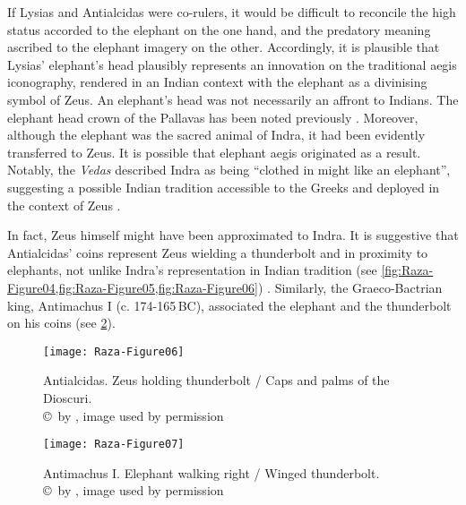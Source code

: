 \documentclass{ijsra}
\renewcommand\BC{{\,BC\xspace}}
\begin{document}
If Lysias and Antialcidas were co-rulers, it would be difficult to reconcile the high status accorded to the elephant on the one hand, and the predatory meaning ascribed to the elephant imagery on the other.
Accordingly, it is plausible that Lysias’ elephant’s head plausibly represents an innovation on the traditional aegis iconography, rendered in an Indian context with the elephant as a divinising symbol of Zeus.
An elephant’s head was not necessarily an affront to Indians. The elephant head crown of the Pallavas has been noted previously \parencite[66--70]{Hudson2008}. 
Moreover, although the elephant was the sacred animal of Indra, it had been evidently transferred to Zeus.
It is possible that elephant aegis originated as a result.
Notably, the \emph{Vedas} described Indra as being “clothed in might like an elephant”, suggesting a possible Indian tradition accessible to the Greeks and deployed in the context of Zeus \parencite[22]{Gupta1983}. 

In fact, Zeus himself might have been approximated to Indra.
It is suggestive that Antialcidas’ coins represent Zeus wielding a thunderbolt and in proximity to elephants, not unlike Indra’s representation in Indian tradition (see \cref{fig:Raza-Figure04,fig:Raza-Figure05,fig:Raza-Figure06}) \parencite[242--247]{MacDowall2007b}.
Similarly, the Graeco-Bactrian king, Antimachus I (c. 174-165\BC), associated the elephant and the thunderbolt on his coins (see \cref{fig:Raza-Figure07}). 

\begin{figure}[!htb] %
	\centering
	\texttt{[image: Raza-Figure06]}
	\caption{Antialcidas. Zeus holding thunderbolt / Caps and palms of the Dioscuri.
		{\normalfont\scriptsize \\ \copyright\ by \cite{Coin}, image used by permission}}
	\label{fig:Raza-Figure06}
\end{figure}

\begin{figure}[!htb] %
	\centering
	\texttt{[image: Raza-Figure07]}
	\caption{Antimachus I. Elephant walking right / Winged thunderbolt.
		{\normalfont\scriptsize \\ \copyright\ by \cite{Coin}, image used by permission}}
	\label{fig:Raza-Figure07}
\end{figure}
\end{document}
